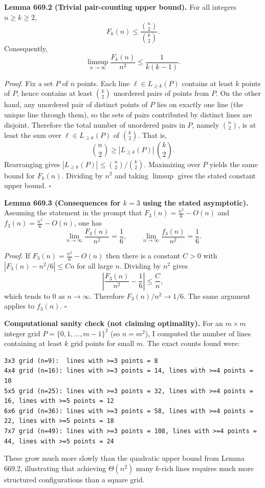 \medskip
\noindent\textbf{Lemma 669.2 (Trivial pair-counting upper bound).}
For all integers $n\ge k\ge 2$,
\[
F_k(n) \le \frac{\binom n2}{\binom k2}.
\]
Consequently,
\[
\limsup_{n\to\infty} \frac{F_k(n)}{n^2} \le \frac{1}{k(k-1)}.
\]

\noindent\emph{Proof.}
Fix a set $P$ of $n$ points.
Each line $\ell\in L_{\ge k}(P)$ contains at least $k$ points of $P$, hence contains at least $\binom{k}{2}$ unordered pairs of points from $P$.
On the other hand, any unordered pair of distinct points of $P$ lies on exactly one line (the unique line through them), so the sets of pairs contributed by distinct lines are disjoint.
Therefore the total number of unordered pairs in $P$, namely $\binom n2$, is at least the sum over $\ell\in L_{\ge k}(P)$ of $\binom{k}{2}$.
That is,
\[
\binom n2 \ge |L_{\ge k}(P)|\,\binom k2.
\]
Rearranging gives $|L_{\ge k}(P)|\le \binom n2/\binom k2$.
Maximizing over $P$ yields the same bound for $F_k(n)$.
Dividing by $n^2$ and taking $\limsup$ gives the stated constant upper bound.
\hfill$\square$

\medskip
\noindent\textbf{Lemma 669.3 (Consequences for $k=3$ using the stated asymptotic).}
Assuming the statement in the prompt that
\(F_3(n)=\frac{n^2}{6}-O(n)\)
and
\(f_3(n)=\frac{n^2}{6}-O(n)\),
one has
\[
\lim_{n\to\infty} \frac{F_3(n)}{n^2} = \frac16,
\qquad
\lim_{n\to\infty} \frac{f_3(n)}{n^2} = \frac16.
\]

\noindent\emph{Proof.}
If $F_3(n)=\frac{n^2}{6}-O(n)$ then there is a constant $C>0$ with
\(|F_3(n)-n^2/6|\le Cn\) for all large $n$.
Dividing by $n^2$ gives
\[
\left|\frac{F_3(n)}{n^2}-\frac16\right| \le \frac{C}{n},
\]
which tends to $0$ as $n\to\infty$.
Therefore $F_3(n)/n^2\to 1/6$.
The same argument applies to $f_3(n)$.
\hfill$\square$

\medskip
\noindent\textbf{Computational sanity check (not claiming optimality).}
For an $m\times m$ integer grid $P=\{0,1,\dots,m-1\}^2$ (so $n=m^2$), I computed the number of lines containing at least $k$ grid points for small $m$.
The exact counts found were:
\begin{verbatim}
3x3 grid (n=9):  lines with >=3 points = 8
4x4 grid (n=16): lines with >=3 points = 14, lines with >=4 points = 10
5x5 grid (n=25): lines with >=3 points = 32, lines with >=4 points = 16, lines with >=5 points = 12
6x6 grid (n=36): lines with >=3 points = 58, lines with >=4 points = 22, lines with >=5 points = 18
7x7 grid (n=49): lines with >=3 points = 108, lines with >=4 points = 44, lines with >=5 points = 24
\end{verbatim}
These grow much more slowly than the quadratic upper bound from Lemma 669.2, illustrating that achieving $\Theta(n^2)$ many $k$-rich lines requires much more structured configurations than a square grid.

